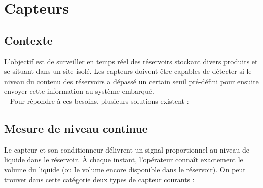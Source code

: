 \section {Capteurs}

	\subsection {Contexte} 
	L’objectif est de surveiller en temps réel des réservoirs stockant divers produits et se situant dans un site isolé. Les capteurs doivent être capables de détecter si le niveau du contenu des réservoirs a dépassé un certain seuil pré-défini pour ensuite envoyer cette information au système embarqué. \\~
Pour répondre à ces besoins, plusieurs solutions existent : 

	\subsection {Mesure de niveau continue}
 	Le capteur et son conditionneur délivrent un signal proportionnel au niveau de liquide dans le réservoir. À chaque instant, l'opérateur connaît exactement le volume du liquide (ou le volume encore disponible dans le réservoir).  On peut trouver dans cette catégorie deux types de capteur  courants : 

